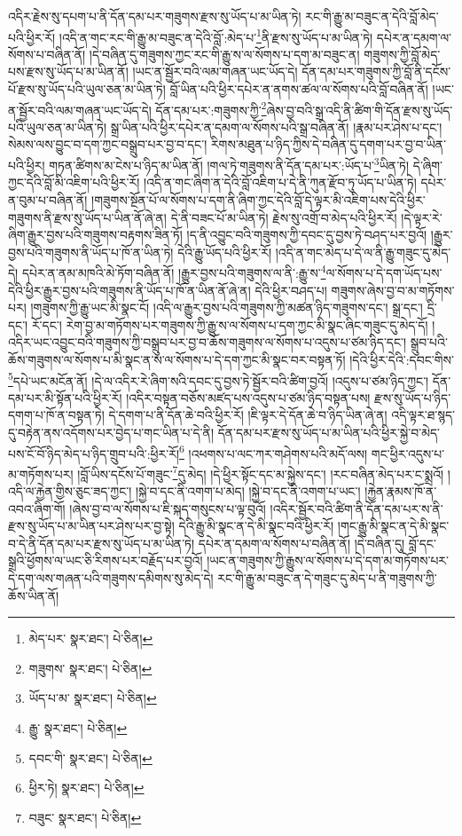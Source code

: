 འདིར་རྗེས་སུ་དཔག་པ་ནི་དོན་དམ་པར་གཟུགས་རྫས་སུ་ཡོད་པ་མ་ཡིན་ཏེ། རང་གི་རྒྱུ་མ་བཟུང་ན་དེའི་བློ་མེད་པའི་ཕྱིར་རོ། །འདི་ན་གང་རང་གི་རྒྱུ་མ་བཟུང་ན་དེའི་བློ་:མེད་པ་\footnote{མེད་པར་  སྣར་ཐང་།  པེ་ཅིན། }ནི་རྫས་སུ་ཡོད་པ་མ་ཡིན་ཏེ། དཔེར་ན་དམག་ལ་སོགས་པ་བཞིན་ནོ། །དེ་བཞིན་དུ་གཟུགས་ཀྱང་རང་གི་རྒྱུ་ས་ལ་སོགས་པ་དག་མ་བཟུང་ན། གཟུགས་ཀྱི་བློ་མེད་པས་རྫས་སུ་ཡོད་པ་མ་ཡིན་ནོ། །ཡང་ན་སྦྱོར་བའི་ལམ་གཞན་ཡང་ཡོད་དེ། དོན་དམ་པར་གཟུགས་ཀྱི་བློ་ནི་དངོས་པོ་རྫས་སུ་ཡོད་པའི་ཡུལ་ཅན་མ་ཡིན་ཏེ། བློ་ཡིན་པའི་ཕྱིར་དཔེར་ན་ནགས་ཚལ་ལ་སོགས་པའི་བློ་བཞིན་ནོ། །ཡང་ན་སྦྱོར་བའི་ལམ་གཞན་ཡང་ཡོད་དེ། དོན་དམ་པར་:གཟུགས་ཀྱི་\footnote{གཟུགས་  སྣར་ཐང་།  པེ་ཅིན། }ཞེས་བྱ་བའི་སྒྲ་འདི་ནི་ཚིག་གི་དོན་རྫས་སུ་ཡོད་པའི་ཡུལ་ཅན་མ་ཡིན་ཏེ། སྒྲ་ཡིན་པའི་ཕྱིར་དཔེར་ན་དམག་ལ་སོགས་པའི་སྒྲ་བཞིན་ནོ། །རྣམ་པར་ཤེས་པ་དང་། སེམས་ལས་བྱུང་བ་དག་ཀྱང་བསྒྲུབ་པར་བྱ་བ་དང་། རིགས་མཐུན་པ་ཉིད་ཀྱིས་དེ་བཞིན་དུ་དགག་པར་བྱ་བ་ཡིན་པའི་ཕྱིར། གཏན་ཚིགས་མ་ངེས་པ་ཉིད་མ་ཡིན་ནོ། །གལ་ཏེ་གཟུགས་ནི་དོན་དམ་པར་:ཡོད་པ་\footnote{ཡོད་པ་མ་  སྣར་ཐང་།  པེ་ཅིན། }ཡིན་ཏེ། དེ་ཞིག་ཀྱང་དེའི་བློ་མི་འཇིག་པའི་ཕྱིར་རོ། །འདི་ན་གང་ཞིག་ན་དེའི་བློ་འཇིག་པ་དེ་ནི་ཀུན་རྫོབ་ཏུ་ཡོད་པ་ཡིན་ཏེ། དཔེར་ན་བུམ་པ་བཞིན་ནོ། །གཟུགས་སྔོན་པོ་ལ་སོགས་པ་དག་ནི་ཞིག་ཀྱང་དེའི་བློ་དེ་ལྟར་མི་འཇིག་པས་དེའི་ཕྱིར་གཟུགས་ནི་རྫས་སུ་ཡོད་པ་ཡིན་ནོ་ཞེ་ན། དེ་ནི་བཟང་པོ་མ་ཡིན་ཏེ། རྗེས་སུ་འགྲོ་བ་མེད་པའི་ཕྱིར་རོ། །དེ་ལྟར་རེ་ཞིག་རྒྱུར་བྱས་པའི་གཟུགས་བརྟགས་ཟིན་ཏོ། །ད་ནི་འབྱུང་བའི་གཟུགས་ཀྱི་དབང་དུ་བྱས་ཏེ་བཤད་པར་བྱའོ། །རྒྱུར་བྱས་པའི་གཟུགས་ནི་ཡོད་པ་ཁོ་ན་ཡིན་ཏེ། དེའི་རྒྱུ་ཡོད་པའི་ཕྱིར་རོ། །འདི་ན་གང་མེད་པ་དེ་ལ་ནི་རྒྱུ་གཟུང་དུ་མེད་དེ། དཔེར་ན་ནམ་མཁའི་མེ་ཏོག་བཞིན་ནོ། །རྒྱུར་བྱས་པའི་གཟུགས་ལ་ནི་:རྒྱུ་ས་\footnote{རྒྱུ་  སྣར་ཐང་།  པེ་ཅིན། }ལ་སོགས་པ་དེ་དག་ཡོད་པས་དེའི་ཕྱིར་རྒྱུར་བྱས་པའི་གཟུགས་ནི་ཡོད་པ་ཁོ་ན་ཡིན་ནོ་ཞེ་ན། དེའི་ཕྱིར་བཤད་པ། གཟུགས་ཞེས་བྱ་བ་མ་གཏོགས་པར། །གཟུགས་ཀྱི་རྒྱུ་ཡང་མི་སྣང་ངོ། །འདི་ལ་རྒྱུར་བྱས་པའི་གཟུགས་ཀྱི་མཚན་ཉིད་གཟུགས་དང་། སྒྲ་དང་། དྲི་དང་། རོ་དང་། རེག་བྱ་མ་གཏོགས་པར་གཟུགས་ཀྱི་རྒྱུ་ས་ལ་སོགས་པ་དག་ཀྱང་མི་སྣང་ཞིང་གཟུང་དུ་མེད་དོ། །འདིར་ཡང་འབྱུང་བའི་གཟུགས་ཀྱི་བསྒྲུབ་པར་བྱ་བ་ཆོས་གཟུགས་ལ་སོགས་པ་འདུས་པ་ཙམ་ཉིད་དང་། སྒྲུབ་པའི་ཆོས་གཟུགས་ལ་སོགས་པ་མི་སྣང་ན་ས་ལ་སོགས་པ་དེ་དག་ཀྱང་མི་སྣང་བར་བསྟན་ཏོ། །དེའི་ཕྱིར་དེའི་:དབང་གིས་\footnote{དབང་གི་  སྣར་ཐང་།  པེ་ཅིན། }དཔེ་ཡང་མངོན་ནོ། །དེ་ལ་འདིར་རེ་ཞིག་སའི་དབང་དུ་བྱས་ཏེ་སྦྱོར་བའི་ཚིག་བྱའོ། །འདུས་པ་ཙམ་ཉིད་ཀྱང་། དོན་དམ་པར་མི་སྟོན་པའི་ཕྱིར་རོ། །འདིར་བསྟན་བཅོས་མཛད་པས་འདུས་པ་ཙམ་ཉིད་བསྟན་པས། རྫས་སུ་ཡོད་པ་ཉིད་དགག་པ་ཁོ་ན་བསྟན་ཏེ། དེ་དགག་པ་ནི་དོན་ཆེ་བའི་ཕྱིར་རོ། །ཇི་ལྟར་དེ་དོན་ཆེ་བ་ཉིད་ཡིན་ཞེ་ན། འདི་ལྟར་ཐ་སྙད་དུ་བརྟེན་ནས་འདོགས་པར་བྱེད་པ་གང་ཡིན་པ་དེ་ནི། དོན་དམ་པར་རྫས་སུ་ཡོད་པ་མ་ཡིན་པའི་ཕྱིར་སྐྱེ་བ་མེད་པས་ངོ་བོ་ཉིད་མེད་པ་ཉིད་གྲུབ་པའི་:ཕྱིར་རོ།\footnote{ཕྱིར་ཏེ།  སྣར་ཐང་།  པེ་ཅིན། } །འཕགས་པ་ལང་ཀར་གཤེགས་པའི་མདོ་ལས། གང་ཕྱིར་འདུས་པ་མ་གཏོགས་པར། །བློ་ཡིས་དངོས་པོ་གཟུང་\footnote{བཟུང་  སྣར་ཐང་།  པེ་ཅིན། }དུ་མེད། །དེ་ཕྱིར་སྟོང་དང་མ་སྐྱེས་དང་། །རང་བཞིན་མེད་པར་ང་སྨྲའོ། །འདི་ལ་རྐྱེན་གྱིས་ཅུང་ཟད་ཀྱང་། །སྐྱེ་བ་དང་ནི་འགག་པ་མེད། །སྐྱེ་བ་དང་ནི་འགག་པ་ཡང་། །རྐྱེན་རྣམས་ཁོ་ན་འབའ་ཞིག་གོ། །ཞེས་བྱ་བ་ལ་སོགས་པ་ཇི་སྐད་གསུངས་པ་ལྟ་བུའོ། །འདིར་སྦྱོར་བའི་ཚིག་ནི་དོན་དམ་པར་ས་ནི་རྫས་སུ་ཡོད་པ་མ་ཡིན་པར་ཤེས་པར་བྱ་སྟེ། དེའི་རྒྱུ་མི་སྣང་ན་དེ་མི་སྣང་བའི་ཕྱིར་རོ། །གང་རྒྱུ་མི་སྣང་ན་དེ་མི་སྣང་བ་དེ་ནི་དོན་དམ་པར་རྫས་སུ་ཡོད་པ་མ་ཡིན་ཏེ། དཔེར་ན་དམག་ལ་སོགས་པ་བཞིན་ནོ། །དེ་བཞིན་དུ། བློ་དང་སྒྲའི་ཕྱོགས་ལ་ཡང་ཅི་རིགས་པར་བརྗོད་པར་བྱའོ། །ཡང་ན་གཟུགས་ཀྱི་རྒྱུས་ལ་སོགས་པ་དེ་དག་མ་གཏོགས་པར་དེ་དག་ལས་གཞན་པའི་གཟུགས་དམིགས་སུ་མེད་དེ། རང་གི་རྒྱུ་མ་བཟུང་ན་དེ་གཟུང་དུ་མེད་པ་ནི་གཟུགས་ཀྱི་ཆོས་ཡིན་ནོ། 